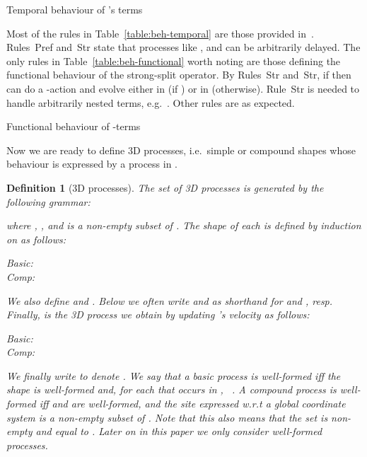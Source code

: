 \documentclass[11pt]{article}
\def\name#1{\mbox{\sc #1}}
\newtheorem{definition}{Definition}
\begin{document}
{\small
\begin{table}

\caption{Temporal behaviour of 's terms}
\label{table:beh-temporal}
\end{table}
}

Most of the rules in Table~\ref{table:beh-temporal} are those provided in~\cite{Yi1990}.
Rules~\name{Pref} and~\name{Str} state that processes like ,
 and  can be arbitrarily delayed. The only rules in
Table~\ref{table:beh-functional} worth noting are those defining the functional behaviour of the
strong-split operator.
By Rules~\name{Str} and~\name{Str}, if   then
 can do a -action and evolve either
in  (if ) or in  (otherwise). Rule~\name{Str} is needed to handle arbitrarily nested terms,
e.g.\ . Other rules are as expected.



{\small
\begin{table}[t]

\caption{Functional behaviour of -terms}
\label{table:beh-functional}
\end{table}
}

Now we are ready to define 3D processes, i.e.\ simple or compound shapes whose behaviour is expressed by a process in .

\begin{definition}[3D processes]
\label{def:processes}
The set  of {\em 3D processes} is generated by the following grammar:

where , ,  and  is a non-empty subset of . The
shape of each  is defined by induction on  as follows:

\begin{tabbing}
Basic: \quad \= \\
Comp: \> 
\end{tabbing}
We also define  and . Below
we often write   and  as  shorthand for  and , resp. Finally,  is the 3D process we obtain by updating 's velocity as follows:
\begin{tabbing}
Basic: \quad \=  \\
Comp: \> 
\end{tabbing}
We finally write  to denote . We say that
a basic process  is {\em well-formed} iff the shape  is well-formed and, for each  that occurs in , \ . A
compound process  is well-formed iff  and  are well-formed,  and the site  expressed w.r.t a global coordinate system is a non-empty subset of
. Note that this also means that the set  is non-empty and equal to . Later on in this paper we
only consider well-formed processes.
\end{definition}
\end{document}
